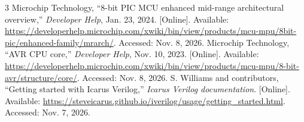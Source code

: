 \documentclass[conference,a4paper]{IEEEtran}
\begin{document}
\begin{thebibliography}{3}
 Microchip Technology, ``8-bit PIC MCU enhanced mid-range
architectural overview,'' \textit{Developer Help}, Jan. 23, 2024.
[Online]. Available:
\url{https://developerhelp.microchip.com/xwiki/bin/view/products/mcu-mpu/8bit-pic/enhanced-family/mrarch/}.
Accessed: Nov. 8, 2026.
 Microchip Technology, ``AVR CPU core,'' \textit{Developer
Help}, Nov. 10, 2023. [Online]. Available:
\url{https://developerhelp.microchip.com/xwiki/bin/view/products/mcu-mpu/8-bit-avr/structure/core/}.
Accessed: Nov. 8, 2026.
 S. Williams and contributors, ``Getting started with
Icarus Verilog,'' \textit{Icarus Verilog documentation}. [Online]. Available:
\url{https://steveicarus.github.io/iverilog/usage/getting_started.html}.
Accessed: Nov. 7, 2026.
\end{thebibliography}
\end{document}
